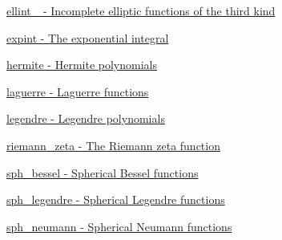 \begin{DoxyItemize}
\item \hyperlink{group__tr29124__math__spec__func_ga20832e3a67d25cc3d415cafc88019ac3}{ellint\+\_ -\/ Incomplete elliptic functions of the third kind}
\item \hyperlink{group__tr29124__math__spec__func_ga88ba17f5d050a6973ca4db1bf6e90590}{expint -\/ The exponential integral}
\item \hyperlink{group__tr29124__math__spec__func_ga97632b8bf77c323b2369e8d327965bdf}{hermite -\/ Hermite polynomials}
\item \hyperlink{group__tr29124__math__spec__func_gacae65579b397fddcd27954380d364a58}{laguerre -\/ Laguerre functions}
\item \hyperlink{group__tr29124__math__spec__func_gaf6eac7fcb98e25b8f3f7d1b95fa7add8}{legendre -\/ Legendre polynomials}
\item \hyperlink{group__tr29124__math__spec__func_ga67a6bfed9b6ab692e8c798b674431424}{riemann\+\_\+zeta -\/ The Riemann zeta function}
\item \hyperlink{group__tr29124__math__spec__func_ga478e517ed975bcb256de230e64f0fda5}{sph\+\_\+bessel -\/ Spherical Bessel functions}
\item \hyperlink{group__tr29124__math__spec__func_ga573842c12247b87746b548f1945755a8}{sph\+\_\+legendre -\/ Spherical Legendre functions}
\item \hyperlink{group__tr29124__math__spec__func_ga1cf4362a67ab5bae9e6b69c867e85371}{sph\+\_\+neumann -\/ Spherical Neumann functions}
\end{DoxyItemize}

